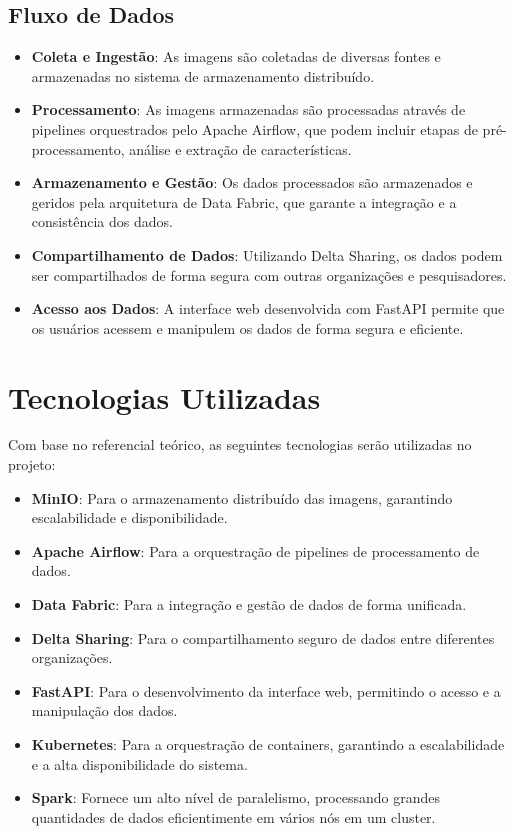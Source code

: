 \subsection{Fluxo de Dados}
\begin{itemize}
    \item \textbf{Coleta e Ingestão}: As imagens são coletadas de diversas fontes e armazenadas no sistema de armazenamento distribuído.
    \item \textbf{Processamento}: As imagens armazenadas são processadas através de pipelines orquestrados pelo Apache Airflow, que podem incluir etapas de pré-processamento, análise e extração de características.
    \item \textbf{Armazenamento e Gestão}: Os dados processados são armazenados e geridos pela arquitetura de Data Fabric, que garante a integração e a consistência dos dados.
    \item \textbf{Compartilhamento de Dados}: Utilizando Delta Sharing, os dados podem ser compartilhados de forma segura com outras organizações e pesquisadores.
    \item \textbf{Acesso aos Dados}: A interface web desenvolvida com FastAPI permite que os usuários acessem e manipulem os dados de forma segura e eficiente.
\end{itemize}

\section{Tecnologias Utilizadas}

Com base no referencial teórico, as seguintes tecnologias serão utilizadas no projeto:
\begin{itemize}
    \item \textbf{MinIO}: Para o armazenamento distribuído das imagens, garantindo escalabilidade e disponibilidade.
    \item \textbf{Apache Airflow}: Para a orquestração de pipelines de processamento de dados.
    \item \textbf{Data Fabric}: Para a integração e gestão de dados de forma unificada.
    \item \textbf{Delta Sharing}: Para o compartilhamento seguro de dados entre diferentes organizações.
    \item \textbf{FastAPI}: Para o desenvolvimento da interface web, permitindo o acesso e a manipulação dos dados.
    \item \textbf{Kubernetes}: Para a orquestração de containers, garantindo a escalabilidade e a alta disponibilidade do sistema.
    \item \textbf{Spark}: Fornece um alto nível de paralelismo, processando grandes quantidades de dados eficientimente em vários nós em um cluster.
\end{itemize}

